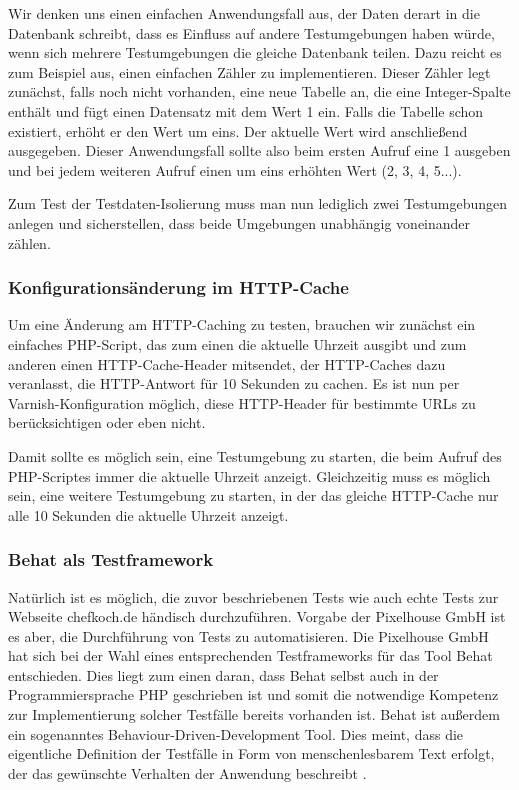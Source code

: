Wir denken uns einen einfachen Anwendungsfall aus, der Daten derart in die Datenbank schreibt, dass es Einfluss auf andere Testumgebungen haben würde, wenn sich mehrere Testumgebungen die gleiche Datenbank teilen. Dazu reicht es zum Beispiel aus, einen einfachen Zähler zu implementieren. Dieser Zähler legt zunächst, falls noch nicht vorhanden, eine neue Tabelle an, die eine Integer-Spalte enthält und fügt einen Datensatz mit dem Wert 1 ein. Falls die Tabelle schon existiert, erhöht er den Wert um eins. Der aktuelle Wert wird anschließend ausgegeben. Dieser Anwendungsfall sollte also beim ersten Aufruf eine 1 ausgeben und bei jedem weiteren Aufruf einen um eins erhöhten Wert (2, 3, 4, 5...).

Zum Test der Testdaten-Isolierung muss man nun lediglich zwei Testumgebungen anlegen und sicherstellen, dass beide Umgebungen unabhängig voneinander zählen.

\subsubsection{Konfigurationsänderung im HTTP-Cache}

Um eine Änderung am HTTP-Caching zu testen, brauchen wir zunächst ein einfaches PHP-Script, das zum einen die aktuelle Uhrzeit ausgibt und zum anderen einen HTTP-Cache-Header mitsendet, der HTTP-Caches dazu veranlasst, die HTTP-Antwort für 10 Sekunden zu cachen.
Es ist nun per Varnish-Konfiguration möglich, diese HTTP-Header für bestimmte URLs zu berücksichtigen oder eben nicht.

Damit sollte es möglich sein, eine Testumgebung zu starten, die beim Aufruf des PHP-Scriptes immer die aktuelle Uhrzeit anzeigt. Gleichzeitig muss es möglich sein, eine weitere Testumgebung zu starten, in der das gleiche HTTP-Cache nur alle 10 Sekunden die aktuelle Uhrzeit anzeigt.

\subsubsection{Behat als Testframework}

Natürlich ist es möglich, die zuvor beschriebenen Tests wie auch echte Tests zur Webseite chefkoch.de händisch durchzuführen. Vorgabe der Pixelhouse GmbH ist es aber, die Durchführung von Tests zu automatisieren. Die Pixelhouse GmbH hat sich bei der Wahl eines entsprechenden Testframeworks für das Tool Behat entschieden. Dies liegt zum einen daran, dass Behat selbst auch in der Programmiersprache PHP geschrieben ist und somit die notwendige Kompetenz zur Implementierung solcher Testfälle bereits vorhanden ist. Behat ist außerdem ein sogenanntes Behaviour-Driven-Development Tool. Dies meint, dass die eigentliche Definition der Testfälle in Form von menschenlesbarem Text erfolgt, der das gewünschte Verhalten der Anwendung beschreibt \citep[Vgl.][]{Behat15}.

